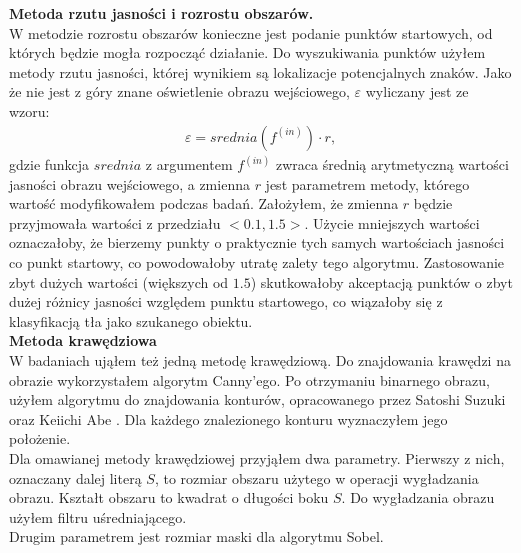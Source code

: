 \textbf{Metoda rzutu jasności i rozrostu obszarów.}\\
W metodzie rozrostu obszarów konieczne jest podanie punktów startowych, od których będzie mogła rozpocząć działanie. Do wyszukiwania punktów użyłem metody rzutu jasności, której wynikiem są lokalizacje potencjalnych znaków. Jako że nie jest z góry znane oświetlenie obrazu wejściowego, $\varepsilon$ wyliczany jest ze wzoru:
\begin{gather*}
  \varepsilon = srednia(f^{(in)}) \cdot r,
\end{gather*}
gdzie funkcja $srednia$ z argumentem $f^{(in)}$ zwraca średnią arytmetyczną wartości jasności obrazu wejściowego, a zmienna $r$ jest parametrem metody, którego wartość modyfikowałem podczas badań. Założyłem, że zmienna $r$ będzie przyjmowała wartości z przedziału $\big<0.1, 1.5\big>$. Użycie mniejszych wartości oznaczałoby, że bierzemy punkty o praktycznie tych samych wartościach jasności co punkt startowy, co powodowałoby utratę zalety tego algorytmu. Zastosowanie zbyt dużych wartości (większych od $1.5$) skutkowałoby akceptacją punktów o zbyt dużej różnicy jasności względem punktu startowego, co wiązałoby się z klasyfikacją tła jako szukanego obiektu.  \\

\textbf{Metoda krawędziowa}\\
W badaniach ująłem też jedną metodę krawędziową. Do znajdowania krawędzi na obrazie wykorzystałem algorytm Canny'ego. Po otrzymaniu binarnego obrazu, użyłem algorytmu do znajdowania konturów, opracowanego przez Satoshi Suzuki oraz Keiichi Abe \cite{suzuki85}. Dla każdego znalezionego konturu wyznaczyłem jego położenie.\\
Dla omawianej metody krawędziowej przyjąłem dwa parametry. Pierwszy z nich, oznaczany dalej literą $S$, to rozmiar obszaru użytego w operacji wygładzania obrazu. Kształt obszaru to kwadrat o długości boku $S$. Do wygładzania obrazu użyłem filtru uśredniającego. \\
Drugim parametrem jest rozmiar maski dla algorytmu Sobel.
